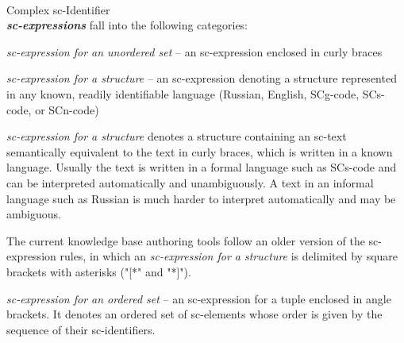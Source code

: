 \begin{frame}{\\Complex sc-Identifier}
	\topline
	\justifying
	\vspace*{\fill}\\
	\scriptsize
		\textbf{\textit{sc-expressions}} fall into the following categories:
		\begin{textitemize}
			\item \textit{sc-expression for an unordered set} -- an sc-expression enclosed in curly braces
			\item \textit{sc-expression for a structure} -- an sc-expression denoting a structure represented in any known, readily identifiable language (Russian, English, SCg-code, SCs-code, or SCn-code)

			\textit{sc-expression for a structure} denotes a structure containing an sc-text semantically equivalent to the text in curly braces, which is written in a known language. Usually the text is written in a formal language such as SCs-code and can be interpreted automatically and unambiguously. A text in an informal language such as Russian is much harder to interpret automatically and may be ambiguous.

			The current knowledge base authoring tools follow an older version of the sc-expression rules, in which an \textit{sc-expression for a structure} is delimited by square brackets with asterisks ("[*"{} and "*]"{}).

			\item \textit{sc-expression for an ordered set} -- an sc-expression for a tuple enclosed in angle brackets. It denotes an ordered set of sc-elements whose order is given by the sequence of their sc-identifiers.
		\end{textitemize}
\end{frame}

